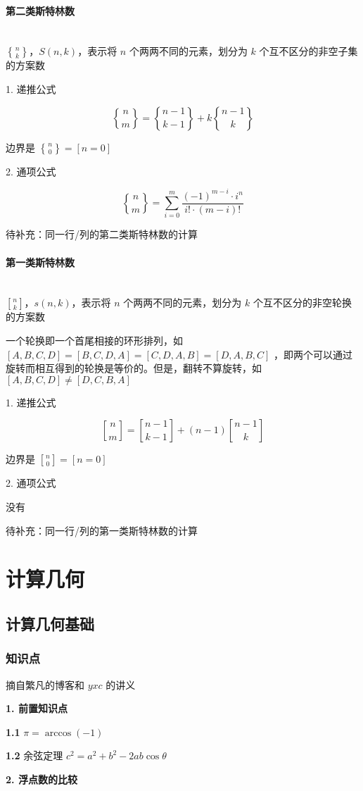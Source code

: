\documentclass[12pt]{article}
\newcommand{\subsubsubsection}[1]{\paragraph{#1}\mbox{}\\}
\begin{document}
\subsubsubsection{第二类斯特林数}

$n\brace k$，$S(n,k)$，表示将 $n$ 个两两不同的元素，划分为 $k$ 个互不区分的非空子集的方案数

1. 递推公式

$$
{n\brace m}={n-1\brace k-1}+k{n-1\brace k}
$$

边界是 ${n\brace 0}=[n=0]$

2. 通项公式

$$
{n\brace m}=\sum_{i=0}^{m}\frac{(-1)^{m-i}\cdot i^n}{i!\cdot(m-i)!}
$$

待补充：同一行/列的第二类斯特林数的计算

\subsubsubsection{第一类斯特林数}

$n\brack k$，$s(n,k)$，表示将 $n$ 个两两不同的元素，划分为 $k$ 个互不区分的非空轮换的方案数

一个轮换即一个首尾相接的环形排列，如 $[A,B,C,D]=[B,C,D,A]=[C,D,A,B]=[D,A,B,C]$ ，即两个可以通过旋转而相互得到的轮换是等价的。但是，翻转不算旋转，如 $[A,B,C,D]\ne[D,C,B,A]$

1. 递推公式

$$
{n\brack m}={n-1\brack k-1}+(n-1){n-1\brack k}
$$

边界是 ${n\brack 0}=[n=0]$

2. 通项公式

\centerline{没有}

待补充：同一行/列的第一类斯特林数的计算

\newpage

{\centering\section{计算几何}}

\subsection{计算几何基础}

\subsubsection{知识点} %

摘自繁凡的博客和 $yxc$ 的讲义

\textbf{1. 前置知识点}

\textbf{1.1} $\pi=\arccos(-1)$
	
\textbf{1.2} 余弦定理 $c^2=a^2+b^2-2ab\cos\theta$

\textbf{2. 浮点数的比较}
\end{document}

